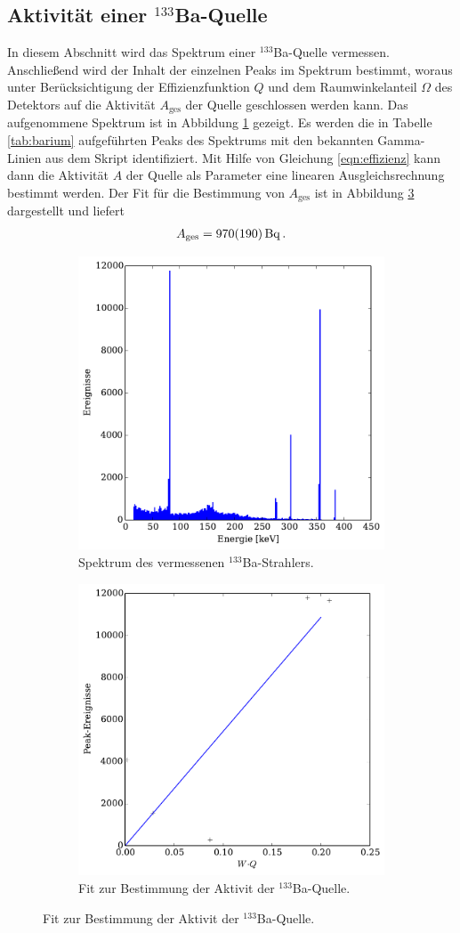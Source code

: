 \subsection{Aktivität einer $^{133}$Ba-Quelle} %
\label{sub:ba_quelle}
In diesem Abschnitt wird das Spektrum einer $^{133}$Ba-Quelle vermessen. Anschließend wird der Inhalt der einzelnen Peaks im Spektrum bestimmt, woraus unter Berücksichtigung der Effizienzfunktion $Q$ und dem Raumwinkelanteil $\Omega$ des Detektors auf die Aktivität $A_\text{ges}$ der Quelle geschlossen werden kann.
Das aufgenommene Spektrum ist in Abbildung \ref{fig:ba_spektrum} gezeigt.
Es werden die in Tabelle \ref{tab:barium} aufgeführten Peaks des Spektrums mit den bekannten Gamma-Linien aus dem Skript identifiziert.
Mit Hilfe von Gleichung \eqref{eqn:effizienz} kann dann die Aktivität $A$ der Quelle als Parameter eine linearen Ausgleichsrechnung bestimmt werden.
Der Fit für die Bestimmung von $A_\text{ges}$ ist in Abbildung \ref{fig:barium_aktivitaet} dargestellt und liefert
\begin{align*}
    A_\text{ges} = \SI{970+-190}{\becquerel}\,.
\end{align*}
\begin{figure}
    \centering
    \begin{subfigure}{0.49\linewidth}
        \includegraphics[width=0.5\linewidth]{img/07_barium.pdf}
        \caption{
            Spektrum des vermessenen $^{133}$Ba-Strahlers.
        }
        \label{fig:ba_spektrum}
    \end{subfigure}
    \begin{subfigure}{0.49\linewidth}
        \includegraphics[width=0.5\linewidth]{img/07_barium_activity.pdf}
        \caption{
            Fit zur Bestimmung der Aktivit der $^{133}$Ba-Quelle.
        }
        \label{fig:barium_aktivitaet}
    \end{subfigure}
\end{figure}

